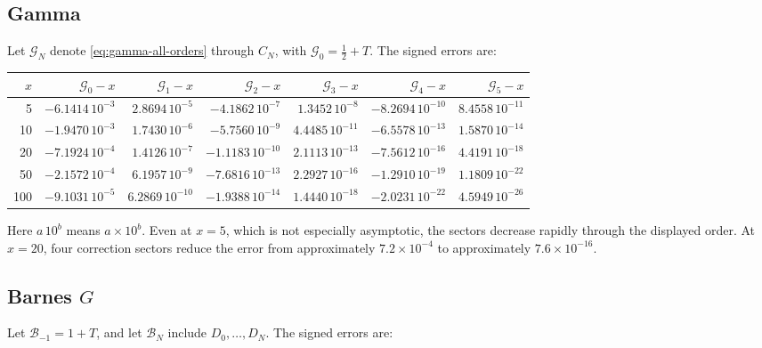 \documentclass[11pt]{article}
\theoremstyle{definition}
\theoremstyle{remark}
\begin{document}
\subsection{Gamma}

Let \(\mathcal G_N\) denote \cref{eq:gamma-all-orders} through \(C_N\), with
\(\mathcal G_0=\tfrac12+T\).  The signed errors are:

\begin{center}
\small
\begin{tabular}{r@{\qquad}rrrrrr}
\toprule
\(x\) & \(\mathcal G_0-x\) & \(\mathcal G_1-x\) & \(\mathcal G_2-x\) & \(\mathcal G_3-x\) & \(\mathcal G_4-x\) & \(\mathcal G_5-x\)\\
\midrule
5
& \(-6.1414\,10^{-3}\) & \(2.8694\,10^{-5}\) & \(-4.1862\,10^{-7}\)
& \(1.3452\,10^{-8}\) & \(-8.2694\,10^{-10}\) & \(8.4558\,10^{-11}\)\\
10
& \(-1.9470\,10^{-3}\) & \(1.7430\,10^{-6}\) & \(-5.7560\,10^{-9}\)
& \(4.4485\,10^{-11}\) & \(-6.5578\,10^{-13}\) & \(1.5870\,10^{-14}\)\\
20
& \(-7.1924\,10^{-4}\) & \(1.4126\,10^{-7}\) & \(-1.1183\,10^{-10}\)
& \(2.1113\,10^{-13}\) & \(-7.5612\,10^{-16}\) & \(4.4191\,10^{-18}\)\\
50
& \(-2.1572\,10^{-4}\) & \(6.1957\,10^{-9}\) & \(-7.6816\,10^{-13}\)
& \(2.2927\,10^{-16}\) & \(-1.2910\,10^{-19}\) & \(1.1809\,10^{-22}\)\\
100
& \(-9.1031\,10^{-5}\) & \(6.2869\,10^{-10}\) & \(-1.9388\,10^{-14}\)
& \(1.4440\,10^{-18}\) & \(-2.0231\,10^{-22}\) & \(4.5949\,10^{-26}\)\\
\bottomrule
\end{tabular}
\end{center}

Here \(a\,10^b\) means \(a\times10^b\).  Even at \(x=5\), which is not especially asymptotic, the sectors decrease rapidly through the displayed order.  At \(x=20\), four correction sectors reduce the error from approximately \(7.2\times10^{-4}\) to approximately \(7.6\times10^{-16}\).

\subsection{Barnes \texorpdfstring{\(G\)}{G}}

Let \(\mathcal B_{-1}=1+T\), and let \(\mathcal B_N\) include
\(D_0,\ldots,D_N\).  The signed errors are:
\end{document}
